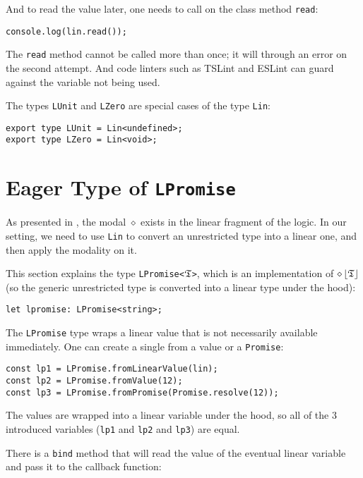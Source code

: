 And to read the value later, one needs to call on the class method \texttt{read}:

\begin{verbatim}
console.log(lin.read());
\end{verbatim}

The \texttt{read} method cannot be called more than once; it will through an error on the second attempt. And code linters such as TSLint and ESLint can guard against the variable not being used.

The types \texttt{LUnit} and \texttt{LZero} are special cases of the type \texttt{Lin}:

\begin{verbatim}
export type LUnit = Lin<undefined>;
export type LZero = Lin<void>;
\end{verbatim}

\section{Eager Type of \texttt{LPromise}}

As presented in , the modal $\diamond$ exists in the linear fragment of the logic. In our setting, we need to use \texttt{Lin} to convert an unrestricted type into a linear one, and then apply the modality on it.

This section explains the type \texttt{LPromise<}$\mathfrak{T}$\texttt{>}, which is an implementation of $\diamond\left\lfloor \mathfrak{T} \right\rfloor$ (so the generic unrestricted type is converted into a linear type under the hood):

\begin{verbatim}
let lpromise: LPromise<string>;
\end{verbatim}

The \texttt{LPromise} type wraps a linear value that is not necessarily available immediately. One can create a single from a value or a \texttt{Promise}:

\begin{verbatim}
const lp1 = LPromise.fromLinearValue(lin);
const lp2 = LPromise.fromValue(12);
const lp3 = LPromise.fromPromise(Promise.resolve(12));
\end{verbatim}

The values are wrapped into a linear variable under the hood, so all of the 3 introduced variables (\texttt{lp1} and \texttt{lp2} and \texttt{lp3}) are equal.

There is a \texttt{bind} method that will read the value of the eventual linear variable and pass it to the callback function:

